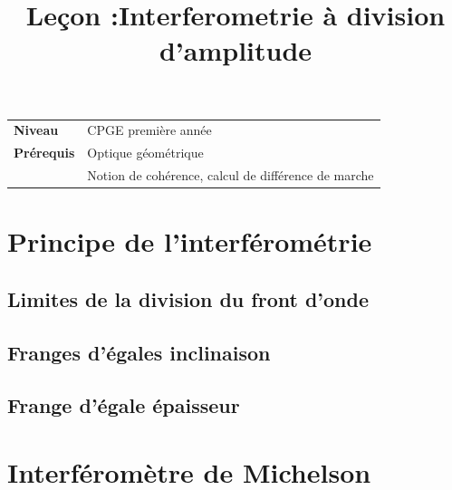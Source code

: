 \documentclass[10pt]{beamer}
\title{Leçon :Interferometrie à division d'amplitude}
\begin{document}
\begin{frame}{}
    \titlepage

    \begin{tabularx}{\textwidth}{l@{:\,\,}X}
        \textbf{Niveau} 	  & CPGE première année\\
        \textbf{Prérequis} & Optique géométrique \\
        & Notion de cohérence, calcul de différence de marche
        
    \end{tabularx}
\end{frame}

\begin{frame}
    \tableofcontents
\end{frame}

\section{Principe de l'interférométrie}
\subsection{Limites de la division du front d'onde}
\subsection{Franges d'égales inclinaison}
\subsection{Frange d'égale épaisseur}
\section{Interféromètre de Michelson}
\end{document}
